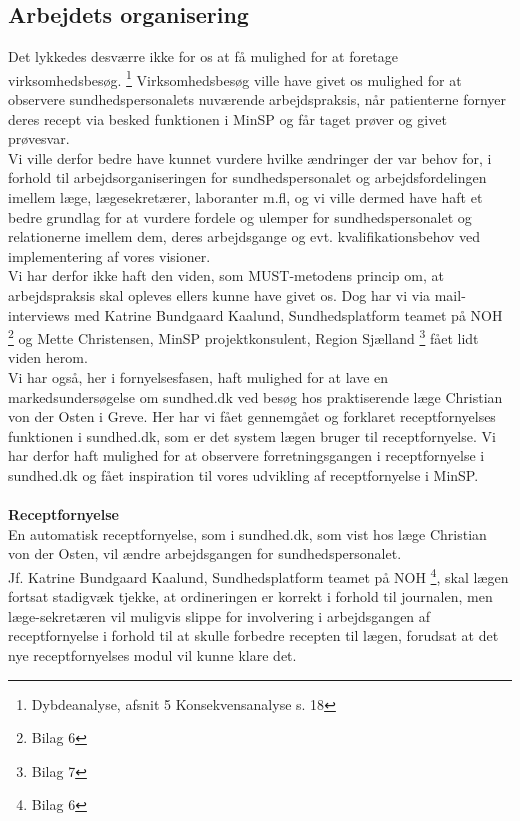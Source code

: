 \subsection{Arbejdets organisering} 
Det lykkedes desværre ikke for os at få mulighed for at foretage virksomhedsbesøg. \footnote{Dybdeanalyse, afsnit 5 Konsekvensanalyse s. 18} Virksomhedsbesøg ville have givet os mulighed for at observere sundhedspersonalets nuværende arbejdspraksis, når patienterne fornyer deres recept via besked funktionen i MinSP og får taget prøver og givet prøvesvar.\\ 
Vi ville derfor bedre have kunnet vurdere hvilke ændringer der var behov for, i forhold til arbejdsorganiseringen for sundhedspersonalet og arbejdsfordelingen imellem læge, lægesekretærer, laboranter m.fl, og vi ville dermed have haft et bedre grundlag for at vurdere fordele og ulemper for sundhedspersonalet og relationerne imellem dem, deres arbejdsgange og evt. kvalifikationsbehov ved implementering af vores visioner.\\
Vi har derfor ikke haft den viden, som MUST-metodens princip om, at arbejdspraksis skal opleves ellers kunne have givet os. Dog har vi via mail-interviews med Katrine Bundgaard Kaalund, Sundhedsplatform teamet på NOH \footnote{Bilag 6} og  Mette Christensen, MinSP projektkonsulent, Region Sjælland \footnote{Bilag 7} fået lidt viden herom. \\
Vi har også, her i fornyelsesfasen, haft mulighed for at lave en markedsundersøgelse om sundhed.dk ved besøg hos praktiserende læge Christian von der Osten i Greve. Her har vi fået gennemgået og forklaret receptfornyelses funktionen i sundhed.dk, som er det system lægen bruger til receptfornyelse. Vi har derfor haft mulighed for at observere forretningsgangen i receptfornyelse i sundhed.dk og fået inspiration til vores udvikling af receptfornyelse i MinSP.\\\\
\textbf{Receptfornyelse} \\
En automatisk receptfornyelse, som i sundhed.dk, som vist hos læge Christian von der Osten, vil ændre arbejdsgangen for sundhedspersonalet. \\ 
Jf. Katrine Bundgaard Kaalund, Sundhedsplatform teamet på NOH \footnote{Bilag 6}, skal lægen fortsat stadigvæk tjekke, at ordineringen er korrekt i forhold til journalen, men læge-sekretæren vil muligvis slippe for involvering i arbejdsgangen af receptfornyelse i forhold til at skulle forbedre recepten til lægen, forudsat at det nye receptfornyelses modul vil kunne klare det.\\
